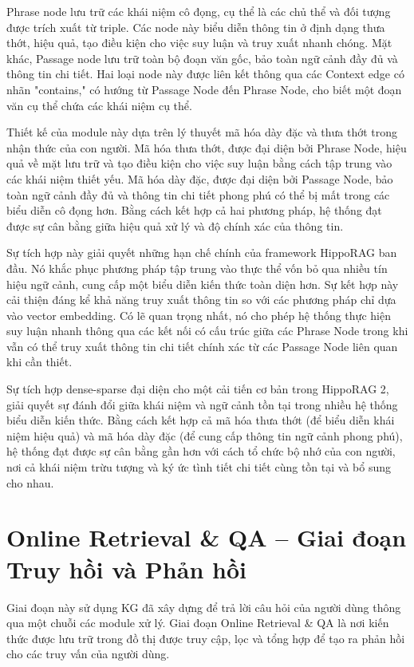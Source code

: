 \documentclass[../main.tex]{subfiles}
\begin{document}
Phrase node lưu trữ các khái niệm cô đọng, cụ thể là các chủ thể và đối tượng được trích xuất từ triple. Các node này biểu diễn thông tin ở định dạng thưa thớt, hiệu quả, tạo điều kiện cho việc suy luận và truy xuất nhanh chóng. Mặt khác, Passage node lưu trữ toàn bộ đoạn văn gốc, bảo toàn ngữ cảnh đầy đủ và thông tin chi tiết. Hai loại node này được liên kết thông qua các Context edge có nhãn "contains," có hướng từ Passage Node đến Phrase Node, cho biết một đoạn văn cụ thể chứa các khái niệm cụ thể.

Thiết kế của module này dựa trên lý thuyết mã hóa dày đặc và thưa thớt trong nhận thức của con người. Mã hóa thưa thớt, được đại diện bởi Phrase Node, hiệu quả về mặt lưu trữ và tạo điều kiện cho việc suy luận bằng cách tập trung vào các khái niệm thiết yếu. Mã hóa dày đặc, được đại diện bởi Passage Node, bảo toàn ngữ cảnh đầy đủ và thông tin chi tiết phong phú có thể bị mất trong các biểu diễn cô đọng hơn. Bằng cách kết hợp cả hai phương pháp, hệ thống đạt được sự cân bằng giữa hiệu quả xử lý và độ chính xác của thông tin.

Sự tích hợp này giải quyết những hạn chế chính của framework HippoRAG ban đầu. Nó khắc phục phương pháp tập trung vào thực thể vốn bỏ qua nhiều tín hiệu ngữ cảnh, cung cấp một biểu diễn kiến thức toàn diện hơn. Sự kết hợp này cải thiện đáng kể khả năng truy xuất thông tin so với các phương pháp chỉ dựa vào vector embedding. Có lẽ quan trọng nhất, nó cho phép hệ thống thực hiện suy luận nhanh thông qua các kết nối có cấu trúc giữa các Phrase Node trong khi vẫn có thể truy xuất thông tin chi tiết chính xác từ các Passage Node liên quan khi cần thiết.

Sự tích hợp dense-sparse đại diện cho một cải tiến cơ bản trong HippoRAG 2, giải quyết sự đánh đổi giữa khái niệm và ngữ cảnh tồn tại trong nhiều hệ thống biểu diễn kiến thức. Bằng cách kết hợp cả mã hóa thưa thớt (để biểu diễn khái niệm hiệu quả) và mã hóa dày đặc (để cung cấp thông tin ngữ cảnh phong phú), hệ thống đạt được sự cân bằng gần hơn với cách tổ chức bộ nhớ của con người, nơi cả khái niệm trừu tượng và ký ức tình tiết chi tiết cùng tồn tại và bổ sung cho nhau.

\section{Online Retrieval \& QA – Giai đoạn Truy hồi và Phản hồi}
Giai đoạn này sử dụng KG đã xây dựng để trả lời câu hỏi của người dùng thông qua một chuỗi các module xử lý. Giai đoạn Online Retrieval \& QA là nơi kiến thức được lưu trữ trong đồ thị được truy cập, lọc và tổng hợp để tạo ra phản hồi cho các truy vấn của người dùng.
\end{document}
